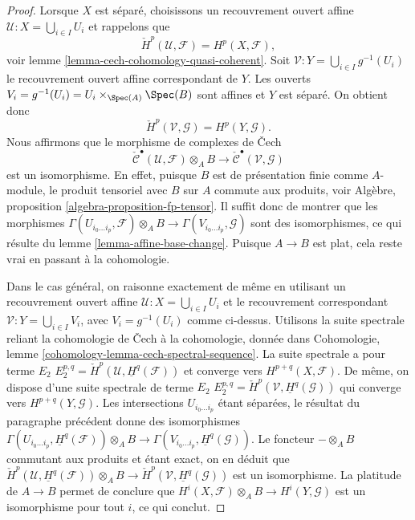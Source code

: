 \begin{proof}
Lorsque $X$ est séparé, choisissons un recouvrement ouvert affine
$\mathcal{U} : X = \bigcup_{i \in I} U_i$ et rappelons que
$$
\check{H}^p(\mathcal{U}, \mathcal{F}) = H^p(X, \mathcal{F}),
$$
voir
lemme \ref{lemma-cech-cohomology-quasi-coherent}.
Soit $\mathcal{V} : Y = \bigcup_{i \in I} g^{-1}(U_i)$
le recouvrement ouvert affine correspondant de $Y$.
Les ouverts $V_i = g^{-1}(U_i) = U_i \times_{\Spec(A)} \Spec(B)$
sont affines et $Y$ est séparé. On obtient donc
$$
\check{H}^p(\mathcal{V}, \mathcal{G}) = H^p(Y, \mathcal{G}).
$$
Nous affirmons que le morphisme de complexes de {\v C}ech
$$
\check{\mathcal{C}}^\bullet(\mathcal{U}, \mathcal{F}) \otimes_A B
\longrightarrow
\check{\mathcal{C}}^\bullet(\mathcal{V}, \mathcal{G})
$$
est un isomorphisme. En effet, puisque $B$ est de présentation finie comme $A$-module,
le produit tensoriel avec $B$ sur $A$ commute aux produits, voir
Algèbre, proposition \ref{algebra-proposition-fp-tensor}.
Il suffit donc de montrer que les morphismes
$\Gamma(U_{i_0 \ldots i_p}, \mathcal{F}) \otimes_A B \to
\Gamma(V_{i_0 \ldots i_p}, \mathcal{G})$
sont des isomorphismes, ce qui résulte du
lemme \ref{lemma-affine-base-change}.
Puisque $A \to B$ est plat, cela reste vrai en passant à la cohomologie.

\medskip\noindent
Dans le cas général, on raisonne exactement de même en utilisant un recouvrement
ouvert affine $\mathcal{U} : X = \bigcup_{i \in I} U_i$ et le
recouvrement correspondant $\mathcal{V} : Y = \bigcup_{i \in I} V_i$,
avec $V_i = g^{-1}(U_i)$ comme ci-dessus. Utilisons la suite spectrale reliant la cohomologie de
{\v C}ech à la cohomologie, donnée
dans Cohomologie, lemme \ref{cohomology-lemma-cech-spectral-sequence}.
La suite spectrale a pour terme $E_2$
$E_2^{p, q} = \check{H}^p(\mathcal{U}, \underline{H}^q(\mathcal{F}))$
et converge vers $H^{p + q}(X, \mathcal{F})$.
De même, on dispose d'une suite spectrale de terme $E_2$
$E_2^{p, q} = \check{H}^p(\mathcal{V}, \underline{H}^q(\mathcal{G}))$
qui converge vers $H^{p + q}(Y, \mathcal{G})$.
Les intersections $U_{i_0 \ldots i_p}$ étant séparées, le résultat
du paragraphe précédent donne des isomorphismes
$\Gamma(U_{i_0 \ldots i_p}, \underline{H}^q(\mathcal{F})) \otimes_A B
\to \Gamma(V_{i_0 \ldots i_p}, \underline{H}^q(\mathcal{G}))$.
Le foncteur $- \otimes_A B$ commutant aux produits et étant exact, on en déduit
que
$\check{H}^p(\mathcal{U}, \underline{H}^q(\mathcal{F})) \otimes_A B
\to \check{H}^p(\mathcal{V}, \underline{H}^q(\mathcal{G}))$
est un isomorphisme. La platitude de $A \to B$ permet de conclure que
$H^i(X, \mathcal{F}) \otimes_A B \to H^i(Y, \mathcal{G})$
est un isomorphisme pour tout $i$, ce qui conclut.
\end{proof}









